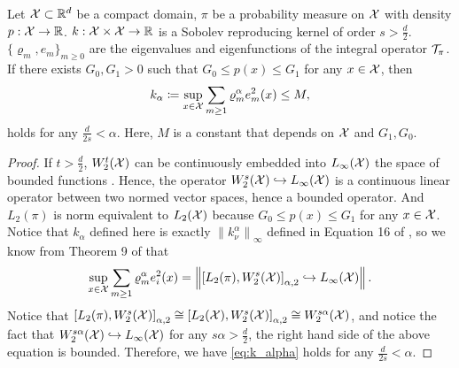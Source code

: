 \begin{lem}\label{lem:embedding}
Let $\mathcal{X} \subset \mathbb{R}^d$ be a compact domain, $\pi$ be a probability measure on $\mathcal{X}$ with density $p:\mathcal{X} \to \mathbb{R}$.
$k : \mathcal{X} \times \mathcal{X} \to \mathbb{R}$ is a Sobolev reproducing kernel of order $s > \frac{d}{2}$. 
$\{ \varrho_m, e_m \}_{m \geq 0}$ are the eigenvalues and eigenfunctions of the integral operator $\mathcal{T}_\pi$.
If there exists $G_0,G_1 > 0$ such that $G_0 \leq p(x) \leq G_1$ for any $x \in \mathcal{X}$, then 
\begin{align}\label{eq:k_alpha}
    k_{\alpha} \coloneq \sup_{x\in\mathcal{X}} \sum_{m \geq 1} \varrho_m^{\alpha } e_m^2(x) \leq M ,
\end{align}
holds for any $ \frac{d}{2s} < \alpha$.
Here, $M$ is a constant that depends on $\mathcal{X}$ and $G_1, G_0$.
\end{lem}
\begin{proof}
If $t > \frac{d}{2}$, $W_2^t(\mathcal{X})$ can be continuously embedded into $L_\infty(\mathcal{X})$ the space of bounded functions \citep[Case A, Theorem 4.12]{adams2003sobolev}.
Hence, the operator $W_2^s(\mathcal{X}) \hookrightarrow L_\infty(\mathcal{X}) $ is a continuous linear operator between two normed vector spaces, hence a bounded operator. 
And $L_2(\pi) $ is norm equivalent to $ L_2(\mathcal{X})$ because $G_0 \leq p(x) \leq G_1$ for any $x \in \mathcal{X}$. 
Notice that $k_\alpha$ defined here is exactly $\left\|k_\nu^\alpha\right\|_{\infty}$ defined in Equation 16 of \cite{fischer2020sobolev}, so we know from Theorem 9 of \citet{fischer2020sobolev} that 
\begin{align*}
     \sup_{x\in\mathcal{X}} \sum_{m \geq 1} \varrho_m^{\alpha} e_i^2(x) = \left\|  \left[L_2(\pi), W_{2}^s(\mathcal{X}) \right]_{\alpha, 2} \hookrightarrow L_{\infty}(\mathcal{X}) \right\| .
\end{align*}
Notice that $\left[L_2(\pi), W_{2}^s(\mathcal{X}) \right]_{\alpha, 2} \cong \left[L_2(\mathcal{X}), W_{2}^s(\mathcal{X}) \right]_{\alpha, 2} \cong W_{2}^{s \alpha}(\mathcal{X})$, and notice the fact that $W_2^{s\alpha}(\mathcal{X}) \hookrightarrow L_\infty(\mathcal{X})$ for any $s\alpha > \frac{d}{2}$, the right hand side of the above equation is bounded. Therefore, we have \eqref{eq:k_alpha} holds for any $\frac{d}{2s} < \alpha$.
\end{proof}


